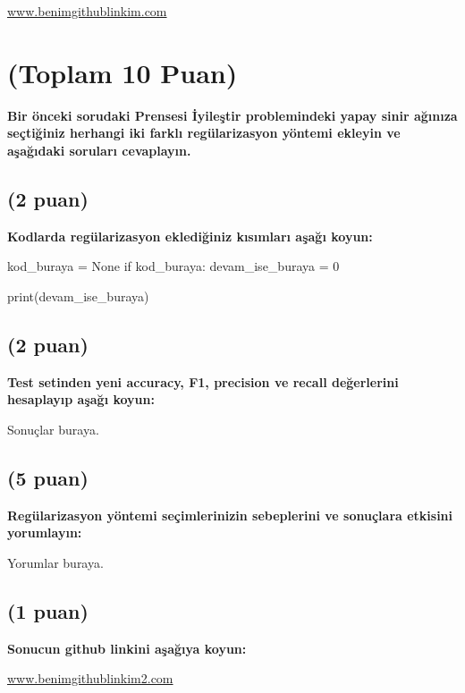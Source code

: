 \documentclass[11pt]{article}
\begin{document}
\url{www.benimgithublinkim.com}

\section{(Toplam 10 Puan)} \textbf{Bir önceki sorudaki Prensesi İyileştir problemindeki yapay sinir ağınıza seçtiğiniz herhangi iki farklı regülarizasyon yöntemi ekleyin ve aşağıdaki soruları cevaplayın.} 

\subsection{(2 puan)} \textbf{Kodlarda regülarizasyon eklediğiniz kısımları aşağı koyun:} 

\begin{python}
kod_buraya = None
if kod_buraya:
    devam_ise_buraya = 0

print(devam_ise_buraya)
\end{python}

\subsection{(2 puan)} \textbf{Test setinden yeni accuracy, F1, precision ve recall değerlerini hesaplayıp aşağı koyun:}

Sonuçlar buraya.

\subsection{(5 puan)} \textbf{Regülarizasyon yöntemi seçimlerinizin sebeplerini ve sonuçlara etkisini yorumlayın:}

Yorumlar buraya.

\subsection{(1 puan)} \textbf{Sonucun github linkini  aşağıya koyun:}

\url{www.benimgithublinkim2.com}
\end{document}
